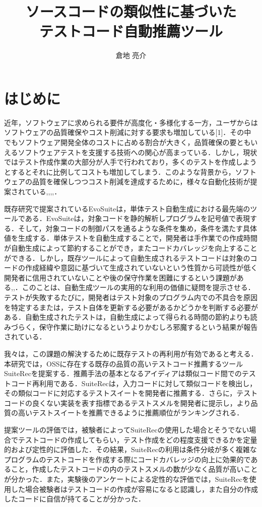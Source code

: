 \documentclass[12pt]{jarticle} %
\title{ソースコードの類似性に基づいた\\テストコード自動推薦ツール}
\author{倉地 亮介}
\begin{document}
%
%
\titlepage
\cmemberspage
\firstabstract
\secondabstract
%
%
\toc
\newpage
\listoffigures
\listoftables
%
%
\newpage
\section{はじめに}
近年，ソフトウェアに求められる要件が高度化・多様化する一方，ユーザからはソフトウェアの品質確保やコスト削減に対する要求も増加している[1]．その中でもソフトウェア開発全体のコストに占める割合が大きく，品質確保の要ともいえるソフトウェアテストを支援する技術への関心が高まっている\cite{b20}．しかし，現状ではテスト作成作業の大部分が人手で行われており，多くのテストを作成しようとするとそれに比例してコストも増加してしまう．このような背景から，ソフトウェアの品質を確保しつつコスト削減を達成するために，様々な自動化技術が提案されている\cite{b3},\cite{b16},\cite{b17},\cite{b18},\cite{b19}．

既存研究で提案されているEvoSuite\cite{b3}は，単体テスト自動生成における最先端のツールである．EvoSuiteは，対象コードを静的解析しプログラムを記号値で表現する．そして，対象コードの制御パスを通るような条件を集め，条件を満たす具体値を生成する．単体テストを自動生成することで，開発者は手作業での作成時間が自動生成によって節約することができ，またコードカバレッジを向上することができる．しかし，既存ツールによって自動生成されるテストコードは対象のコードの作成経緯や意図に基づいて生成されていないという性質から可読性が低く開発者に信用されていないことや後の保守作業を困難にするという課題がある\cite{b13},\cite{b14},\cite{b15}．このことは、自動生成ツールの実用的な利用の価値に疑問を提示させる．テストが失敗するたびに，開発者はテスト対象のプログラム内での不具合を原因を特定するまたは，テスト自体を更新する必要があるかどうかを判断する必要がある．自動生成されたテストは，自動生成によって得られる時間の節約よりも読みづらく，保守作業に助けになるというよりかむしろ邪魔するという結果が報告されている\cite{b1}．

我々は，この課題の解決するために既存テストの再利用が有効であると考える．本研究では，OSSに存在する既存の品質の高いテストコード推薦するツール{\sf SuiteRec}を提案する．推薦手法の基本となるアイディアは類似コード間でのテストコード再利用である．{\sf SuiteRec}は，入力コードに対して類似コードを検出し，その類似コードに対応するテストスイートを開発者に推薦する．さらに，テストコードの良くない実装を表す指標であるテストスメルを開発者に提示し，より品質の高いテストスイートを推薦できるように推薦順位がランキングされる．

提案ツールの評価では，被験者によって{\sf SuiteRec}の使用した場合とそうでない場合でテストコードの作成してもらい，テスト作成をどの程度支援できるかを定量的および定性的に評価した．その結果，{\sf SuiteRec}の利用は条件分岐が多く複雑なプログラムのテストコードを作成する際にコードカバレッジの向上に効果的であること，作成したテストコードの内のテストスメルの数が少なく品質が高いことが分かった．また，実験後のアンケートによる定性的な評価では，{\sf SuiteRec}を使用した場合被験者はテストコードの作成が容易になると認識し，また自分の作成したコードに自信が持てることが分かった．
\end{document}

